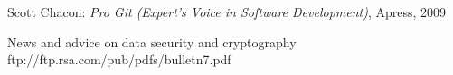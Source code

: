 \documentclass[11pt,a4paper,oneside, 
liststotoc, 					%
bibtotoc,						%
titlepage, 						%
headsepline, 					%
BCOR6mm,						%
]{scrreprt}
\begin{document}
\setcounter{secnumdepth}{3}	%
\setcounter{tocdepth}{3}
\sffamily									  %



\tableofcontents							%
\printnomenclature[2.0cm]			%
\listoffigures 								%
\pagebreak

\pagestyle{fancy}					
\rmfamily






\begin{thebibliography}{999999}

 Scott Chacon: \emph{Pro Git (Expert's Voice in Software Development)}, Apress, 2009

 News and advice on data security and cryptography 
ftp://ftp.rsa.com/pub/pdfs/bulletn7.pdf

\end{thebibliography}


\begin{appendix}
\clearpage
{}
\end{appendix}
\end{document}
